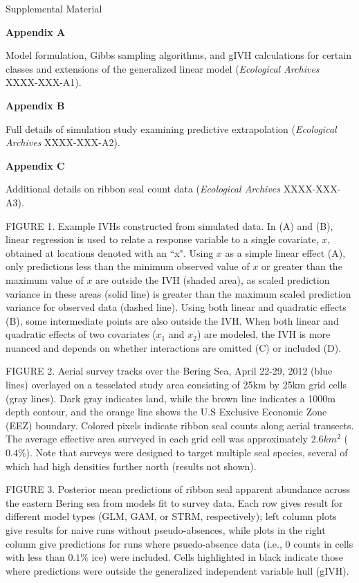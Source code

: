 \documentclass[12pt,english]{article}
\begin{document}
\begin{spacing}{1.9}


\centerline{\sc Supplemental Material}

\centerline{\bf Appendix A}
Model formulation, Gibbs sampling algorithms, and gIVH calculations for certain classes and extensions of the generalized linear model ({\it Ecological Archives} XXXX-XXX-A1).

\centerline{\bf Appendix B}
Full details of simulation study examining predictive extrapolation ({\it Ecological Archives} XXXX-XXX-A2).

\centerline{\bf Appendix C}
Additional details on ribbon seal count data ({\it Ecological Archives} XXXX-XXX-A3).

\clearpage

FIGURE 1. Example IVHs constructed from simulated data.  In (A) and (B), linear regression is used to relate a response variable to a single covariate, $x$, obtained at locations denoted with an ``x".  Using $x$ as a simple linear effect (A), only predictions less than the minimum observed value of $x$ or greater than the maximum value of $x$ are outside the IVH (shaded area), as scaled prediction variance in these areas (solid line) is greater than the maximum scaled prediction variance for observed data (dashed line).  Using both linear and quadratic effects (B), some intermediate points are also outside the IVH.  When both linear and quadratic effects of two covariates ($x_1$ and $x_2$) are modeled, the IVH is more nuanced and depends on whether interactions are omitted (C) or included (D).


FIGURE 2. Aerial survey tracks over the Bering Sea, April 22-29, 2012 (blue lines) overlayed on a tesselated study area consisting of 25km by 25km grid cells (gray lines).  Dark gray indicates land, while the brown line indicates a 1000m depth contour, and the orange line shows the U.S Exclusive Economic Zone (EEZ) boundary. Colored pixels indicate ribbon seal counts along aerial transects. The average effective area surveyed in each grid cell was approximately $2.6km^2$ ($0.4\%$).  Note that surveys were designed to target multiple seal species, several of which had high densities further north (results not shown).

FIGURE 3.  Posterior mean predictions of ribbon seal apparent abundance across the eastern Bering sea from models fit to survey data.  Each row gives result for different model types (GLM, GAM, or STRM, respectively); left column plots give results for naive runs without pseudo-absences, while plots in the right column give predictions for runs where psuedo-absence data (i.e., 0 counts in cells with less than $0.1\%$ ice) were included. Cells highlighted in black indicate those where predictions were outside the generalized independent variable hull (gIVH).


\end{spacing}
\end{document}
